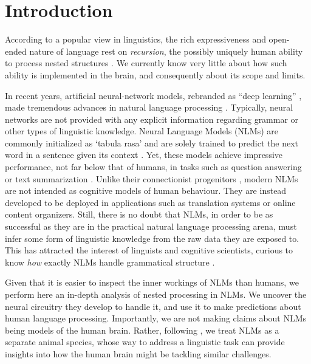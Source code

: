 \section{Introduction}

According to a popular view in linguistics, the rich expressiveness
and open-ended nature of language rest on \emph{recursion}, the
possibly uniquely human ability to process nested structures \citep{Chomsky:1957, Hauser:etal:2002, Dehaene:etal:2015}. We
currently know very little about how such ability is implemented in
the brain, and consequently about its scope and limits.

In recent years, artificial neural-network models, rebranded as ``deep learning'' \citep{LeCun:etal:2015}, made tremendous advances in natural language processing \citep{Goldberg:2017}. Typically, neural networks are not provided with any explicit information regarding grammar or other types of linguistic knowledge. Neural Language Models (NLMs) are commonly initialized as `tabula rasa' and are solely trained to predict the next word in a sentence given its context \citep{Elman:1990}. Yet, these models achieve impressive performance, not far below that of humans, in tasks such as question answering or text summarization \citep{Radford:etal:2019}. Unlike their connectionist progenitors \citep{Rumelhart:etal:1986,Rumelhart:etal:1986b}, modern NLMs are not intended as cognitive models of human behaviour. They are instead developed to be deployed in applications such as translation systems or online content organizers. Still, there is no doubt that NLMs, in order to be as successful as they are in the practical natural language processing arena, must infer some form of linguistic knowledge from the raw data they are exposed to. This has attracted the interest of linguists and cognitive scientists, curious to know  \textit{how} exactly NLMs handle grammatical structure \citep[see][for a survey]{Linzen:Baroni:2020}.

Given that it is easier to inspect the inner workings of NLMs than humans, we perform here an in-depth analysis of nested processing in NLMs. We uncover the neural circuitry they develop to handle it, and use it to make predictions about human language processing. Importantly, we are not making claims about NLMs being models of the human brain. Rather, following \citet{McCloskey:1991}, we treat NLMs as a separate animal species, whose way to address a linguistic task can provide insights into how the human brain might be tackling similar challenges.

